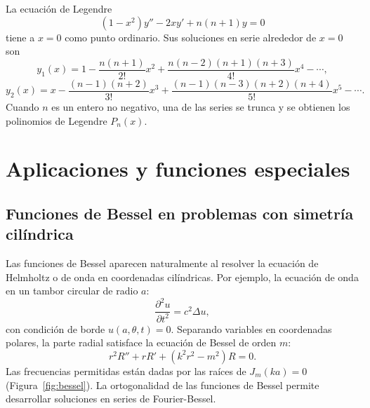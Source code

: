 \begin{rem}
  La ecuación de Legendre
  \[
    (1-x^2)y'' - 2x y' + n(n+1)y = 0
  \]
  tiene a $x=0$ como punto ordinario. Sus soluciones en serie alrededor de $x=0$ son
  \[
    y_1(x)=1-\frac{n(n+1)}{2!}x^2+\frac{n(n-2)(n+1)(n+3)}{4!}x^4-\cdots,
  \]
  \[
    y_2(x)=x-\frac{(n-1)(n+2)}{3!}x^3+\frac{(n-1)(n-3)(n+2)(n+4)}{5!}x^5-\cdots.
  \]
  Cuando $n$ es un entero no negativo, una de las series se trunca y se obtienen los polinomios de Legendre $P_n(x)$.
\end{rem}

\section{Aplicaciones y funciones especiales}

\subsection{Funciones de Bessel en problemas con simetría cilíndrica}

Las funciones de Bessel aparecen naturalmente al resolver la ecuación de Helmholtz o de onda en coordenadas cilíndricas. Por ejemplo, la ecuación de onda en un tambor circular de radio $a$:
\[
  \frac{\partial^2 u}{\partial t^2} = c^2 \Delta u,
\]
con condición de borde $u(a,\theta,t)=0$. Separando variables en coordenadas polares, la parte radial satisface la ecuación de Bessel de orden $m$:
\[
  r^2 R'' + r R' + (k^2 r^2 - m^2)R = 0.
\]
Las frecuencias permitidas están dadas por las raíces de $J_m(k a)=0$ (Figura~\ref{fig:bessel}). La ortogonalidad de las funciones de Bessel permite desarrollar soluciones en series de Fourier-Bessel.

